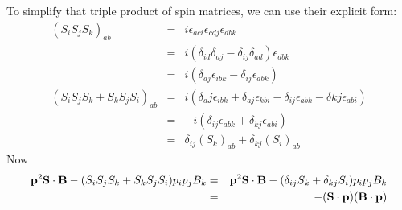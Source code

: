 To simplify that triple product of spin matrices, we can use their explicit form:
\begin{eqnarray*}
	(S_i S_j S_k )_{ab}
		&=&	i\epsilon_{aci}\epsilon_{cdj}\epsilon_{dbk}	\\
		&=&	i(\delta_{id} \delta_{aj} - \delta_{ij} \delta_{ad})\epsilon_{dbk}	\\
		&=&	i(\delta_{aj} \epsilon_{ibk} - \delta_{ij} \epsilon_{abk})		\\
	(S_i S_j S_k + S_k S_j S_i)_{ab}
		&=& i(\delta_aj \epsilon_{ibk} + \delta_{aj} \epsilon_{kbi} -\delta_{ij} \epsilon_{abk} -\delta{kj}\epsilon_{abi})	\\
		&=& -i(\delta_{ij} \epsilon_{abk} + \delta_{kj} \epsilon_{abi})	\\
		&=&	\delta_{ij} {(S_k)}_{ab} + \delta_{kj} {(S_i)}_{ab}	
\end{eqnarray*}
Now 
\begin{eqnarray*}
 \mathbf{p}^2 \mathbf{S} \cdot \mathbf{B} - (S_i S_j S_k + S_k S_j S_i) p_i p_j B_k
 	&=& \mathbf{p}^2 \mathbf{S} \cdot \mathbf{B} - (\delta_{ij} S_k + \delta_{kj} S_i	) p_i p_j B_k	\\
 	&=& - (\mathbf{S} \cdot \mathbf{p}) (\mathbf{B} \cdot \mathbf{p})
\end{eqnarray*}
